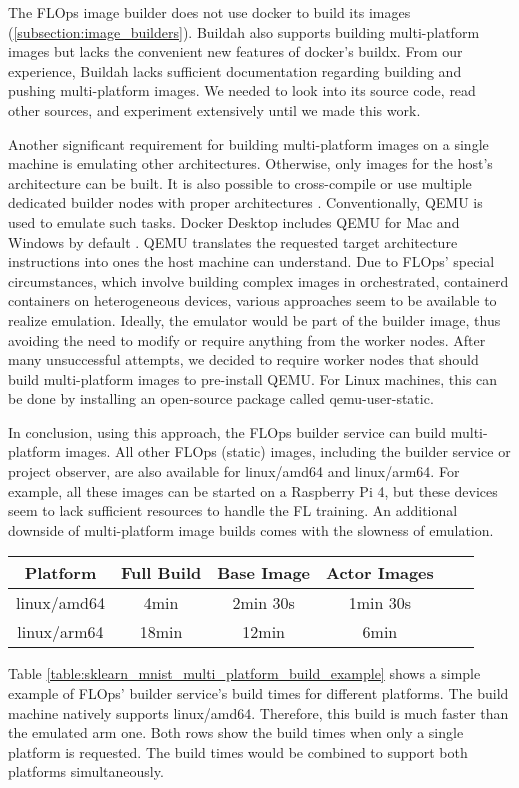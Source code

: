 The FLOps image builder does not use docker to build its images (\ref{subsection:image_builders}).
Buildah also supports building multi-platform images but lacks the convenient new features of docker's buildx.
From our experience, Buildah lacks sufficient documentation regarding building and pushing multi-platform images.
We needed to look into its source code, read other sources, and experiment extensively until we made this work.

Another significant requirement for building multi-platform images on a single machine is emulating other architectures.
Otherwise, only images for the host's architecture can be built.
It is also possible to cross-compile or use multiple dedicated builder nodes with proper architectures \cite{docs:docker_multiplatform_image_builds}.
Conventionally, QEMU \cite{docs:quemu} is used to emulate such tasks.
Docker Desktop includes QEMU for Mac and Windows by default \cite{docs:docker_multiplatform_image_builds}.
QEMU translates the requested target architecture instructions into ones the host machine can understand.
Due to FLOps' special circumstances, which involve building complex images in orchestrated, containerd containers on heterogeneous devices, various approaches seem to be available to realize emulation.
Ideally, the emulator would be part of the builder image, thus avoiding the need to modify or require anything from the worker nodes.
After many unsuccessful attempts, we decided to require worker nodes that should build multi-platform images to pre-install QEMU.
For Linux machines, this can be done by installing an open-source package called qemu-user-static.

In conclusion, using this approach, the FLOps builder service can build multi-platform images.
All other FLOps (static) images, including the builder service or project observer, are also available for linux/amd64 and linux/arm64.
For example, all these images can be started on a Raspberry Pi 4, but these devices seem to lack sufficient resources to handle the FL training.
An additional downside of multi-platform image builds comes with the slowness of emulation.
\begin{changemargin}{0cm}{0cm}
    \centering
    \begin{tabular}{|c|c|c|c|c|c|}
        \hline
            \textbf{Platform} & \textbf{Full Build} & \textbf{Base Image} & \textbf{Actor Images} \\
        \hline
            linux/amd64 & 4min & 2min 30s & 1min 30s \\
        \hline
            linux/arm64 & 18min & 12min & 6min 
        \\
        \hline
    \end{tabular}
    \label{table:sklearn_mnist_multi_platform_build_example}
\end{changemargin}
Table \ref{table:sklearn_mnist_multi_platform_build_example} shows a simple example of FLOps' builder service's build times for different platforms.
The build machine natively supports linux/amd64.
Therefore, this build is much faster than the emulated arm one.
Both rows show the build times when only a single platform is requested.
The build times would be combined to support both platforms simultaneously.
